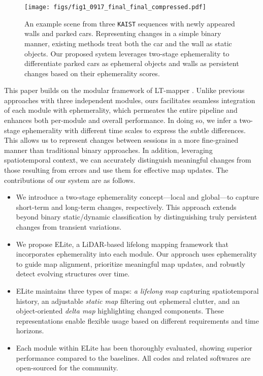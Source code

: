 \begin{figure}[!t]
    \centering
    \texttt{[image: figs/fig1\_0917\_final\_final\_compressed.pdf]}
    \caption{
    An example scene from three \texttt{KAIST} sequences \cite{kim2020mulran, jung2023helipr} with newly appeared walls and parked cars. 
    Representing changes in a simple binary manner, existing methods treat both the car and the wall as static objects. 
    Our proposed system leverages two-stage ephemerality to differentiate parked cars as ephemeral objects and walls as persistent changes based on their ephemerality scores.
    }
    \label{fig:figure_1}
    \vspace{-5mm}
\end{figure}

This paper builds on the modular framework of LT-mapper \cite{kim2022lt}.
Unlike previous approaches \cite{kim2022lt, yang2024lifelong} with three independent modules, ours facilitates seamless integration of each module with ephemerality, which permeates the entire pipeline and enhances both per-module and overall performance.
In doing so, we infer a two-stage ephemerality with different time scales to express the subtle differences.
This allows us to represent changes between sessions in a more fine-grained manner than traditional binary approaches. 
In addition, leveraging spatiotemporal context, we can accurately distinguish meaningful changes from those resulting from errors and use them for effective map updates. 
The contributions of our system are as follows.
\begin{itemize}
    \item We introduce a two-stage ephemerality concept---local and global---to capture short-term and long-term changes, respectively.
    This approach extends beyond binary static/dynamic classification by distinguishing truly persistent changes from transient variations.

    \item
    We propose ELite, a LiDAR-based lifelong mapping framework that incorporates ephemerality into each module. 
    Our approach uses ephemerality to guide map alignment, prioritize meaningful map updates, and robustly detect evolving structures over time.

    \item 
    ELite maintains three types of maps: \textit{a lifelong map} capturing spatiotemporal history, an adjustable \textit{static map} filtering out ephemeral clutter, and an object-oriented \textit{delta map} highlighting changed components. These representations enable flexible usage based on different requirements and time horizons.

    \item Each module within ELite has been thoroughly evaluated, showing superior performance compared to the baselines. All codes and related softwares are open-sourced for the community.
\end{itemize}